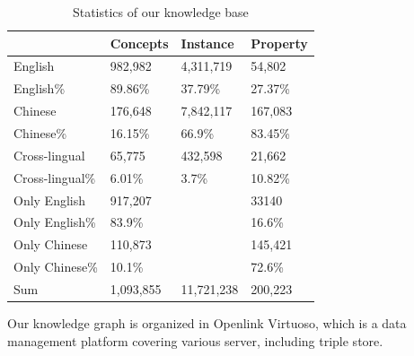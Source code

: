 \documentclass[runningheads,a4paper]{llncs}
\begin{document}
\begin{table}[h]
\small
\centering
\caption{Statistics of our knowledge base}
\label{tab:kb-result}
    \begin{tabular}{|l|l|l|l|}
        \hline
                        & Concepts  & Instance   & Property \\ \hline
        English         & 982,982   & 4,311,719  & 54,802   \\ \hline
        English\%       & 89.86\%   & 37.79\%    & 27.37\%  \\ \hline
        Chinese         & 176,648   & 7,842,117  & 167,083  \\ \hline
        Chinese\%       & 16.15\%   & 66.9\%     & 83.45\%  \\ \hline
        Cross-lingual   & 65,775    & 432,598    & 21,662   \\ \hline
        Cross-lingual\% & 6.01\%    & 3.7\%      & 10.82\%  \\ \hline
        Only English    & 917,207   &            & 33140    \\ \hline
        Only English\%  & 83.9\%    &            & 16.6\%   \\ \hline
        Only Chinese    & 110,873   &            & 145,421  \\ \hline
        Only Chinese\%  & 10.1\%    &            & 72.6\%   \\ \hline
        Sum             & 1,093,855 & 11,721,238 & 200,223  \\ \hline
    \end{tabular}
\end{table}

Our knowledge graph is organized in Openlink Virtuoso, which is a data management platform covering various server, including triple store. 
\end{document}
